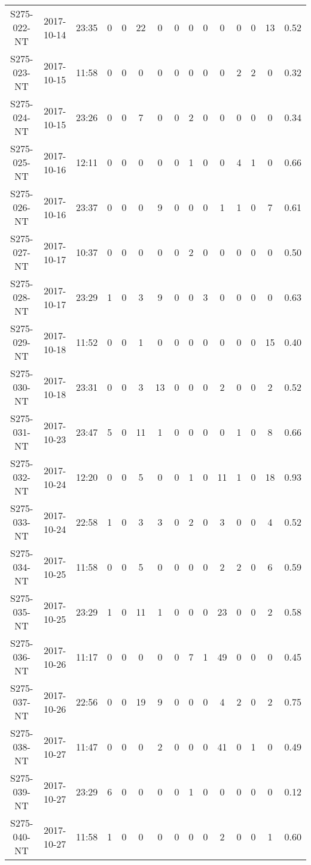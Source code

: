 \begin{longtable}{ccccccccccccccc}
  S275-022-NT & 2017-10-14 & 23:35 & 0 & 0 & 22 & 0 & 0 & 0 & 0 & 0 & 0 & 0 & 13 & 0.52 \\ 
  S275-023-NT & 2017-10-15 & 11:58 & 0 & 0 & 0 & 0 & 0 & 0 & 0 & 0 & 2 & 2 & 0 & 0.32 \\ 
  S275-024-NT & 2017-10-15 & 23:26 & 0 & 0 & 7 & 0 & 0 & 2 & 0 & 0 & 0 & 0 & 0 & 0.34 \\ 
  S275-025-NT & 2017-10-16 & 12:11 & 0 & 0 & 0 & 0 & 0 & 1 & 0 & 0 & 4 & 1 & 0 & 0.66 \\ 
  S275-026-NT & 2017-10-16 & 23:37 & 0 & 0 & 0 & 9 & 0 & 0 & 0 & 1 & 1 & 0 & 7 & 0.61 \\ 
  S275-027-NT & 2017-10-17 & 10:37 & 0 & 0 & 0 & 0 & 0 & 2 & 0 & 0 & 0 & 0 & 0 & 0.50 \\ 
  S275-028-NT & 2017-10-17 & 23:29 & 1 & 0 & 3 & 9 & 0 & 0 & 3 & 0 & 0 & 0 & 0 & 0.63 \\ 
  S275-029-NT & 2017-10-18 & 11:52 & 0 & 0 & 1 & 0 & 0 & 0 & 0 & 0 & 0 & 0 & 15 & 0.40 \\ 
  S275-030-NT & 2017-10-18 & 23:31 & 0 & 0 & 3 & 13 & 0 & 0 & 0 & 2 & 0 & 0 & 2 & 0.52 \\ 
  S275-031-NT & 2017-10-23 & 23:47 & 5 & 0 & 11 & 1 & 0 & 0 & 0 & 0 & 1 & 0 & 8 & 0.66 \\ 
  S275-032-NT & 2017-10-24 & 12:20 & 0 & 0 & 5 & 0 & 0 & 1 & 0 & 11 & 1 & 0 & 18 & 0.93 \\ 
  S275-033-NT & 2017-10-24 & 22:58 & 1 & 0 & 3 & 3 & 0 & 2 & 0 & 3 & 0 & 0 & 4 & 0.52 \\ 
  S275-034-NT & 2017-10-25 & 11:58 & 0 & 0 & 5 & 0 & 0 & 0 & 0 & 2 & 2 & 0 & 6 & 0.59 \\ 
  S275-035-NT & 2017-10-25 & 23:29 & 1 & 0 & 11 & 1 & 0 & 0 & 0 & 23 & 0 & 0 & 2 & 0.58 \\ 
  S275-036-NT & 2017-10-26 & 11:17 & 0 & 0 & 0 & 0 & 0 & 7 & 1 & 49 & 0 & 0 & 0 & 0.45 \\ 
  S275-037-NT & 2017-10-26 & 22:56 & 0 & 0 & 19 & 9 & 0 & 0 & 0 & 4 & 2 & 0 & 2 & 0.75 \\ 
  S275-038-NT & 2017-10-27 & 11:47 & 0 & 0 & 0 & 2 & 0 & 0 & 0 & 41 & 0 & 1 & 0 & 0.49 \\ 
  S275-039-NT & 2017-10-27 & 23:29 & 6 & 0 & 0 & 0 & 0 & 1 & 0 & 0 & 0 & 0 & 0 & 0.12 \\ 
  S275-040-NT & 2017-10-27 & 11:58 & 1 & 0 & 0 & 0 & 0 & 0 & 0 & 2 & 0 & 0 & 1 & 0.60 \\ 
  \hline
\end{longtable}

